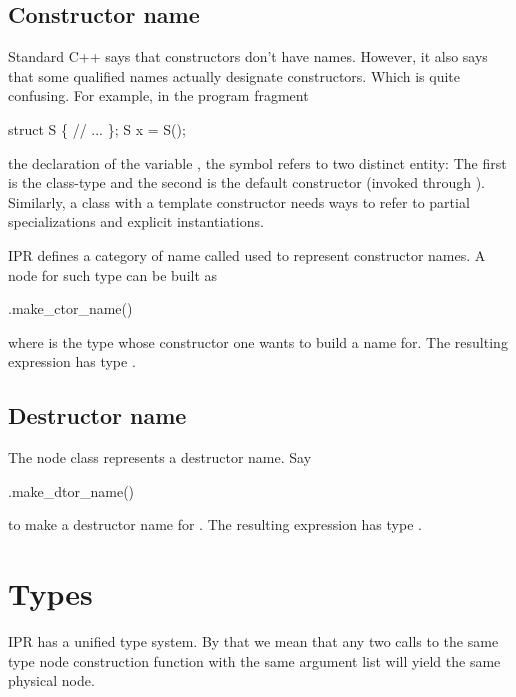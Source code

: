 \documentclass[11pt]{article}
\begin{document}
\subsection{Constructor name}
\label{sec:name.ctor-name}

Standard C++ says that constructors don't have names.  However, it also says
that some qualified names actually designate constructors.  Which is quite
confusing. For example, in the program fragment
\begin{Program}
  struct S \{
     // ...
  \};
  S x = S();
\end{Program}
the declaration of the variable , the symbol  refers to two
distinct entity: The first is the class-type and the second is the default
constructor (invoked through ).  
Similarly, a class with a template constructor needs ways to refer to partial
specializations and explicit instantiations.  

IPR defines a category of name called  used to represent
constructor names.  A node for such type can be built as
\begin{Program}
  .make_ctor_name()
\end{Program}
where  is the type whose constructor one wants to build a name for.
The resulting expression has type .  

\subsection{Destructor name}
\label{sec:name.dtor-name}

The node class  represents a destructor name.  Say
\begin{Program}
  .make_dtor_name()
\end{Program}
to make a destructor name for .  The resulting expression has type
.


\section{Types}
\label{sec:types}

IPR has a unified type system.  By that we mean that any two
calls to the same type node construction function with the same argument list
will yield the same physical node.
\end{document}
